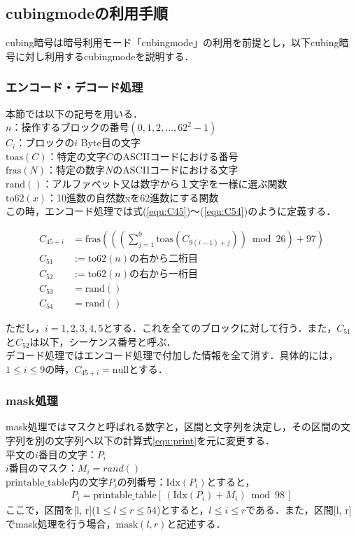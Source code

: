 \documentclass[a4j,titlepage]{jsarticle}
\begin{document}
\subsection{cubingmodeの利用手順}
cubing暗号は暗号利用モード「cubingmode」の利用を前提とし，以下cubing暗号に対し利用するcubingmodeを説明する．

\subsubsection{エンコード・デコード処理}
本節では以下の記号を用いる．\\
\noindent
\(n\)：操作するブロックの番号\((0,1,2,...,62^2-1)\)\\
\(C_i\)：ブロックの\(i\) Byte目の文字\\
\(\mathrm{toas}(C)\)：特定の文字\(C\)のASCIIコードにおける番号\\
\(\mathrm{fras}(N)\)：特定の数字\(N\)のASCIIコードにおける文字\\
\(\mathrm{rand}()\)：アルファベット又は数字から１文字を一様に選ぶ関数\\
\(\mathrm{to62}(x)\)：10進数の自然数xを62進数にする関数\\
この時，エンコード処理では式(\ref{equ:C45})〜(\ref{equ:C54})のように定義する．

\begin{align}
  C_{45 + i} &= \mathrm{fras} \left( \left( \left( \sum_{j = 1}^9 \mathrm{toas}(C_{9 \left( i - 1 \right) + j} )\right)\bmod 26 \right) + 97 \right) \label{equ:C45}\\
  C_{51} &:= \mathrm{to62}(n)の右から二桁目 \\
  C_{52} &:= \mathrm{to62}(n)の右から一桁目 \\
  C_{53} &= \mathrm{rand}() \\
  C_{54} &= \mathrm{rand}() \label{equ:C54}
\end{align}

ただし，\(i=1,2,3,4,5\)とする．これを全てのブロックに対して行う．また，\(C_{51}\)と\(C_{52}\)は以下，シーケンス番号と呼ぶ．\\
デコード処理ではエンコード処理で付加した情報を全て消す．具体的には，\(1 \leq i \leq 9\)の時，\(C_{45+i}=\mathrm{null}\)とする．

\subsubsection{mask処理}
mask処理ではマスクと呼ばれる数字と，区間と文字列を決定し，その区間の文字列を別の文字列へ以下の計算式\ref{equ:print}を元に変更する．\\
平文の\(i\)番目の文字：\(P_i\)\\
\(i\)番目のマスク：\(M_i = rand()\)\\
\(\mathrm{printable\_table}\)内の文字\(P_i\)の列番号：\(\mathrm{Idx}(P_i)\)とすると，
\begin{align}
  P_i=\mathrm{printable\_table}[\,(\mathrm{Idx}(P_i)+M_i) \bmod 98\,]\label{equ:print}
\end{align}
ここで，区間を[l, r](\(1 \leq l \leq r \leq 54\))とすると，\(l\leq i \leq r\)である．また，区間[l, r]でmask処理を行う場合，\(\mathrm{mask}(l, r)\)と記述する．
\end{document}
